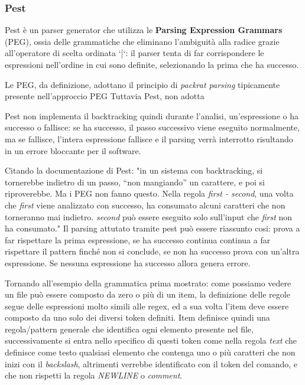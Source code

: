 \documentclass{article}
\begin{document}
    \subsubsection{Pest}
    Pest è un parser generator che utilizza le \textbf{Parsing Expression Grammars} (PEG), ossia delle grammatiche che eliminano l'ambiguità alla radice grazie all'operatore di scelta ordinata `|`: il parser tenta di far corrispondere le espressioni nell'ordine in cui sono definite, selezionando la prima che ha successo.

    Le PEG, da definizione, adottano il principio di \textit{packrat parsing} tipicamente presente nell'approccio PEG
    Tuttavia Pest,  non adotta

    Pest non implementa il backtracking quindi durante l'analisi, un'espressione o ha successo o fallisce: se ha successo, il passo successivo viene eseguito normalmente, ma se fallisce, l'intera espressione fallisce e il parsing verrà interrotto risultando in un errore bloccante per il software.

    Citando la documentazione di Pest: "in un sistema con backtracking, si tornerebbe indietro di un passo, “non mangiando” un carattere, e poi si riproverebbe. Ma i PEG non fanno questo. Nella regola \textit{first - second}, una volta che \textit{first} viene analizzato con successo, ha consumato alcuni caratteri che non torneranno mai indietro. \textit{second} può essere eseguito solo sull'input che \textit{first} non ha consumato."
    Il parsing attutato tramite pest può essere riassunto cosi: prova a far rispettare la prima espressione, se ha successo continua continua a far rispettare il pattern finché non si conclude, se non ha successo prova con un'altra espressione. Se nessuna espressione ha successo allora genera errore.

    Tornando all'esempio della grammatica prima mostrato: come possiamo vedere un file può essere composto da zero o più di un item, la definizione delle regole segue delle espressioni molto simili alle regex, ed a sua volta l'item deve essere composto da uno solo dei diversi token definiti.
    Item definisce quindi una regola/pattern generale che identifica ogni elemento presente nel file, successivamente si entra nello specifico di questi token come nella regola \textit{text} che definisce come testo qualsiasi elemento che contenga uno o più caratteri che non inizi con il \textit{backslash}, altrimenti verrebbe identificato con il token del comando, e che non rispetti la regola \textit{NEWLINE} o \textit{comment}.
\end{document}
